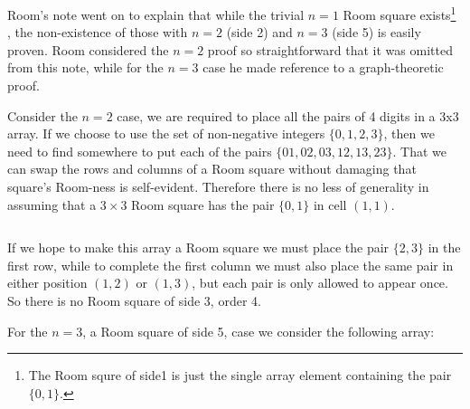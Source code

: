 \documentclass[
  12pt,
  a4paper]{book}
\begin{document}
Room's note went on to explain that while the trivial \(n = 1\) Room square
exists\footnote{The Room squre of side1 is just the single array element
  containing the pair \(\{0,1\}\).} , the non-existence of those with \(n = 2\) (side 2) and \(n = 3\)
(side 5) is easily proven. Room considered the \(n = 2\) proof so
straightforward that it was omitted from this note, while for the \(n = 3\)
case he made reference to a graph-theoretic proof.

Consider the \(n = 2\) case, we are required to place all the pairs of 4
digits in a 3x3 array. If we choose to use the set of non-negative
integers \(\{0, 1, 2, 3\}\), then we need to find somewhere to put each of
the pairs \(\{01, 02, 03, 12, 13, 23\}\). That we can swap the rows and columns
of a Room square without damaging that square's Room-ness is
self-evident. Therefore there is no less of generality in assuming that
a \(3 \times 3\) Room square has the pair \(\{0, 1\}\) in cell \((1, 1)\).

\begin{longtable}[]{@{}c@{}}
\toprule
\endhead
\begin{minipage}[t]{0.07\columnwidth}\centering
01\strut
\end{minipage}\tabularnewline
\bottomrule
\end{longtable}

If we hope to make this array a Room square we must place the pair
\(\{2, 3\}\) in the first row, while to complete the first column we must
also place the same pair in either position \((1, 2)\) or \((1, 3)\), but each
pair is only allowed to appear once. So there is no Room square of side
3, order 4.

For the \(n = 3\), a Room square of side 5, case we consider the following
array:
\end{document}
